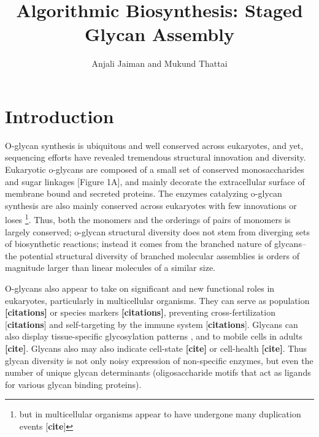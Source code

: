 \documentclass[twocolumn]{article}
\begin{document}
\graphicspath{ {Images/} }
\sectionfont{\fontsize{11}{0}\selectfont}
\setlength{\headsep}{0pt}


\setlength{\parindent}{0pt}

\title{Algorithmic Biosynthesis: Staged Glycan Assembly}
\author{Anjali Jaiman and Mukund Thattai}
\maketitle

\section*{Introduction}

O-glycan synthesis is ubiquitous \cite{Apweiler1999} and well conserved \cite{Varki2009} across eukaryotes, and yet, sequencing efforts have revealed tremendous structural innovation and diversity. Eukaryotic o-glycans are composed of a small set of conserved monosaccharides and sugar linkages \cite{Adibekian2010} [Figure 1A], and mainly decorate the extracellular surface of membrane bound and secreted proteins. The enzymes catalyzing o-glycan synthesis are also mainly conserved across eukaryotes with few innovations or loses \footnote{but in multicellular organisms appear to have undergone many duplication events [\textbf{cite}]}. Thus, both the monomers and the orderings of pairs of monomers is largely conserved; o-glycan structural diversity  does not stem from diverging sets of biosynthetic reactions; instead it comes from the branched nature of glycans-- the potential structural diversity of branched molecular assemblies is orders of magnitude larger than linear molecules of a similar size. 

O-glycans also appear to take on significant and new functional roles in eukaryotes, particularly in multicellular organisms. They can serve as population \textbf{[citations]} or species markers \textbf{[citations]}, preventing cross-fertilization [\textbf{citations}] and self-targeting by the immune system [\textbf{citations}]. Glycans can also display tissue-specific glycosylation patterns \cite{Cole2012}, and to mobile cells in adults  \textbf{[cite]}. Glycans also may also indicate cell-state \textbf{[cite]} or cell-health \textbf{[cite]}. Thus glycan diversity is not only noisy expression of non-specific enzymes, but even the number of unique glycan determinants (oligosaccharide motifs that act as ligands for various glycan binding proteins). 
\end{document}
